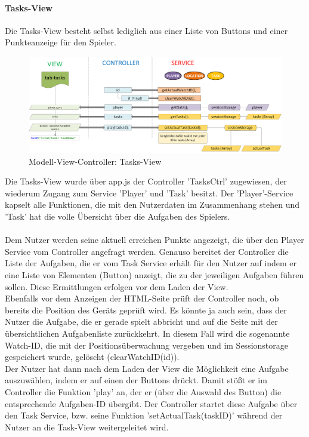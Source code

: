 \paragraph{Tasks-View}
%
%
Die Tasks-View besteht selbst lediglich aus einer Liste von Buttons und einer Punkteanzeige für den Spieler.
%
%
\begin{figure}[h]
\centering
\includegraphics[width=1\textwidth]{ref/images/04-tasks-tab.png}
\caption[Modell-View-Controller: Tasks-View]{Modell-View-Controller: Tasks-View}
\label{fig:MVC:Tasks-View}
\end{figure}
%
%
Die Tasks-View wurde über app.js der Controller 'TasksCtrl' zugewiesen, der wiederum Zugang zum Service 'Player' und 'Task' besitzt. Der 'Player'-Service kapselt alle Funktionen, die mit den Nutzerdaten im Zusammenhang stehen und 'Task' hat die volle Übersicht über die Aufgaben des Spielers.
\\
\\
Dem Nutzer werden seine aktuell erreichen Punkte angezeigt, die über den Player Service vom Controller angefragt werden. Genauso bereitet der Controller die Liste der Aufgaben, die er vom Task Service erhält für den Nutzer auf indem er eine Liste von Elementen (Button) anzeigt, die zu der jeweiligen Aufgaben führen sollen. Diese Ermittlungen erfolgen vor dem Laden der View.
\\
Ebenfalls vor dem Anzeigen der HTML-Seite prüft der Controller noch, ob bereits die Position des Geräts geprüft wird. Es könnte ja auch sein, dass der Nutzer die Aufgabe, die er gerade spielt abbricht und auf die Seite mit der übersichtlichen Aufgabenliste zurückkehrt. In diesem Fall wird die sogenannte Watch-ID, die mit der Positionsüberwachung vergeben und im Sessionstorage gespeichert wurde, gelöscht (clearWatchID(id)).
\\
Der Nutzer hat dann nach dem Laden der View die Möglichkeit eine Aufgabe auszuwählen, indem er auf einen der Buttons drückt. Damit stößt er im Controller die Funktion 'play' an, der er (über die Auswahl des Button) die entsprechende Aufgaben-ID übergibt. Der Controller startet diese Aufgabe über den Task Service, bzw. seine Funktion 'setActualTask(taskID)' während der Nutzer an die Task-View weitergeleitet wird.
